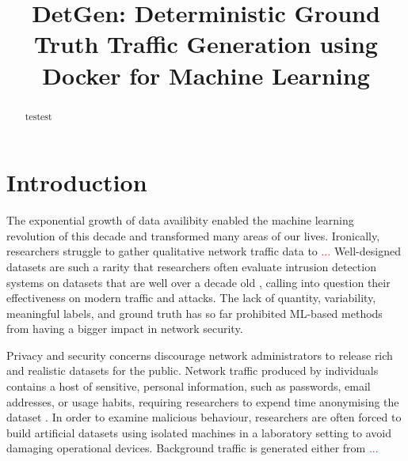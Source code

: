 \documentclass[sigconf,anonymous]{acmart}\usepackage[]{graphicx}\usepackage[]{color}
\begin{document}
\title{DetGen: Deterministic Ground Truth Traffic Generation using Docker for Machine Learning}


\begin{abstract}

testest

\end{abstract}

% 

\maketitle

\section{Introduction}


The exponential growth of data availibity enabled the machine learning revolution of this decade and transformed many areas of our lives. Ironically, researchers struggle to gather qualitative network traffic data to \textcolor{red}{...}
Well-designed datasets are such a rarity that researchers often evaluate intrusion detection systems on datasets that are well over a decade old \cite{tavallaee2009detailed, kayacik2005selecting}, calling into question their effectiveness on modern traffic and attacks. 
The lack of quantity, variability, meaningful labels, and ground truth has so far prohibited ML-based methods from having a bigger impact in network security.


Privacy and security concerns discourage network administrators to release rich and realistic datasets for the public. Network traffic produced by individuals contains a host of sensitive, personal information, such as passwords, email addresses, or usage habits, requiring researchers to expend time anonymising the dataset \cite{mirsky2016sherlock}. In order to examine malicious behaviour, researchers are often forced to build artificial datasets using isolated machines in a laboratory setting to avoid damaging operational devices. Background traffic is generated either from \textcolor{red}{...}
\end{document}
